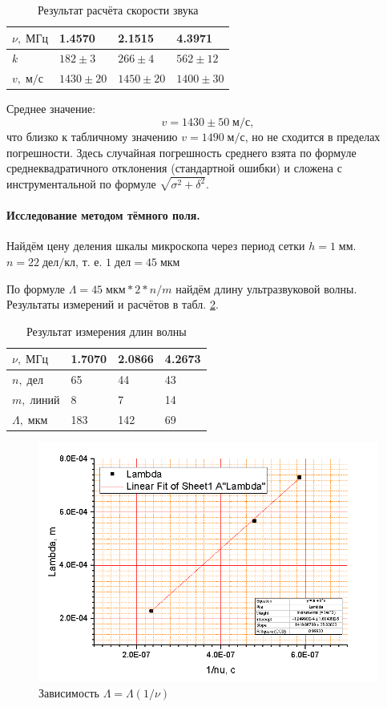 \documentclass[a4paper]{article}
\begin{document}
\begin{table}[h]
	\centering
	\begin{tabular}{|l|l|l|l|}
		\hline
		$\nu, \; МГц$ & 1.4570       & 2.1515       & 4.3971       \\ \hline
		$k$           & $182\pm 3$   & $266\pm 4$   & $562\pm 12$  \\ \hline
		$v, \;м/с$    & $1430\pm 20$ & $1450\pm 20$ & $1400\pm 30$ \\ \hline
	\end{tabular}
	\caption{Результат расчёта скорости звука}
	\label{tab:2}
\end{table}

Среднее значение: $$ v = 1430 \pm 50 \; м/с, $$ что близко к табличному значению $ v = 1490  \; м/с $, но не сходится в пределах погрешности. Здесь случайная погрешность среднего взята по формуле среднеквадратичного отклонения (стандартной ошибки) и сложена с инструментальной по формуле $ \sqrt{\sigma^2+\delta^2} $.

\paragraph{Исследование методом тёмного поля. }

Найдём цену деления шкалы микроскопа через период сетки $ h = 1 \;мм $. $ n = 22\; дел/кл $, т. е. $ 1\; дел = 45\; мкм $

По формуле $ \Lambda = 45\;мкм * 2 * n / m $ найдём длину ультразвуковой волны.
Результаты измерений и расчётов в табл. \ref{tab:3}.

\begin{table}[h]
	\centering
	\begin{tabular}{|l|l|l|l|}
		\hline
		$\nu, \; МГц$     & 1.7070 & 2.0866 & 4.2673 \\ \hline
		$n, \; дел$       & 65     & 44     & 43     \\ \hline
		$m, \; линий$     & 8      & 7      & 14     \\ \hline
		$\Lambda, \; мкм$ & 183    & 142    & 69     \\ \hline
	\end{tabular}
	\caption{Результат измерения длин волны}
	\label{tab:3}
\end{table}

\begin{figure}[tbp]
	\centering
	\includegraphics[width=0.8\linewidth]{Screenshot_3}
	\caption{Зависимость $\Lambda = \Lambda (1/\nu)$}
	\label{fig:3}
\end{figure}
\end{document}
